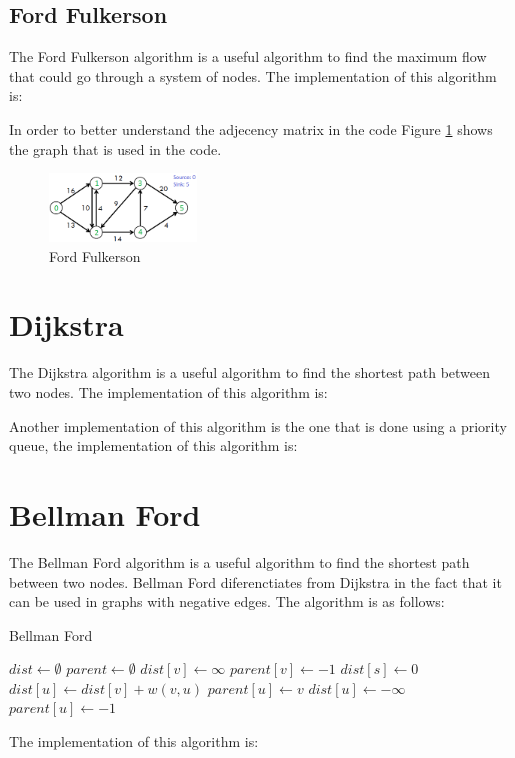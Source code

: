 \subsection{Ford Fulkerson}

The Ford Fulkerson algorithm is a useful algorithm to find the maximum flow that could go through a system of nodes. The implementation of this algorithm is:



In order to better understand the adjecency matrix in the code Figure \ref{fig:ford_fulkerson} shows the graph that is used in the code.

\begin{figure}[h]
\centering
\includegraphics[width=0.35\textwidth]{../Figures/ford_fulkerson11.png}
\caption{Ford Fulkerson}
\label{fig:ford_fulkerson}
\end{figure}

\section{Dijkstra}

The Dijkstra algorithm is a useful algorithm to find the shortest path between two nodes. The implementation of this algorithm is:



Another implementation of this algorithm is the one that is done using a priority queue, the implementation of this algorithm is:



\section{Bellman Ford}

The Bellman Ford algorithm is a useful algorithm to find the shortest path between two nodes. Bellman Ford diferenctiates from Dijkstra in the fact that it can be used in graphs with negative edges. The algorithm is as follows:

\begin{algorithm}
\caption{Bellman Ford}
\label{alg:bellman_ford}
\begin{algorithmic}[1]
\State $dist \gets \emptyset$
\State $parent \gets \emptyset$
\State $dist[v] \gets \infty$
\State $parent[v] \gets -1$
\EndFor
\State $dist[s] \gets 0$
\State $dist[u] \gets dist[v] + w(v, u)$
\State $parent[u] \gets v$
\EndIf
\EndFor
\EndFor
\EndFor
{}
\State $dist[u] \gets -\infty$
\State $parent[u] \gets -1$
\EndIf
\EndFor
\EndFor
\EndProcedure
\end{algorithmic}
\end{algorithm}

The implementation of this algorithm is:

